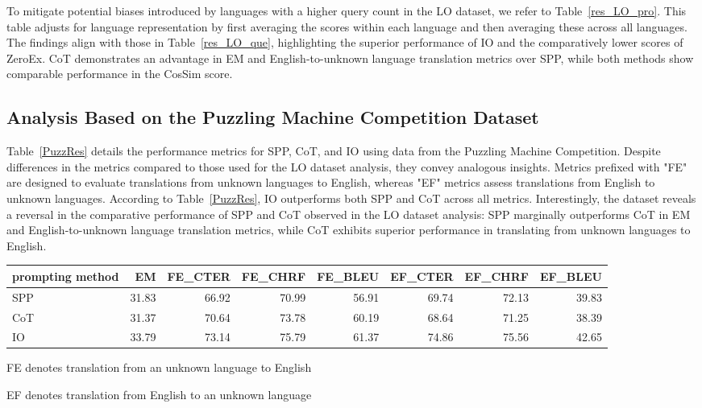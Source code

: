 \documentclass[10pt, a4paper]{article}
\begin{document}
To mitigate potential biases introduced by languages with a higher query count in the LO dataset, we refer to Table~\ref{res_LO_pro}. This table adjusts for language representation by first averaging the scores within each language and then averaging these across all languages. The findings align with those in Table~\ref{res_LO_que}, highlighting the superior performance of IO and the comparatively lower scores of ZeroEx. CoT demonstrates an advantage in EM and English-to-unknown language translation metrics over SPP, while both methods show comparable performance in the CosSim score.

\subsection{Analysis Based on the Puzzling Machine Competition Dataset}

Table~\ref{PuzzRes} details the performance metrics for SPP, CoT, and IO using data from the Puzzling Machine Competition. Despite differences in the metrics compared to those used for the LO dataset analysis, they convey analogous insights. Metrics prefixed with "FE" are designed to evaluate translations from unknown languages to English, whereas "EF" metrics assess translations from English to unknown languages. According to Table~\ref{PuzzRes}, IO outperforms both SPP and CoT across all metrics. Interestingly, the dataset reveals a reversal in the comparative performance of SPP and CoT observed in the LO dataset analysis: SPP marginally outperforms CoT in EM and English-to-unknown language translation metrics, while CoT exhibits superior performance in translating from unknown languages to English.

\begin{table*}
\caption{Puzzling Machine Competition Result}
\begin{threeparttable}
\begin{tabular}{lrrrrrrr}
\label{PuzzRes}
 prompting method   &    EM &   FE\_CTER\tnote{a} &   FE\_CHRF &   FE\_BLEU &   EF\_CTER\tnote{b} &   EF\_CHRF &   EF\_BLEU \\
\hline
 SPP               & 31.83 &     66.92 &     70.99 &     56.91 &     69.74 &     72.13 &     39.83 \\
 CoT               & 31.37 &     70.64 &     73.78 &     60.19 &     68.64 &     71.25 &     38.39 \\
 IO                & 33.79 &     73.14 &     75.79 &     61.37 &     74.86 &     75.56 &     42.65 \\
\hline
\end{tabular}
\begin{tablenotes}
    \item[a] FE denotes translation from an unknown language to English
    \item[b] EF denotes translation from English to an unknown language
\end{tablenotes}
\end{threeparttable}
\end{table*}
\end{document}
